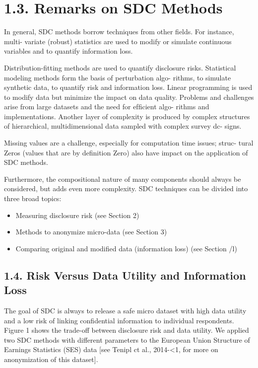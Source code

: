 \documentclass[]{article}
\begin{document}
\section*{1.3. Remarks on SDC Methods}
In general, SDC methods borrow techniques from other ﬁelds. For instance, multi-
variate (robust) statistics are used to modify or simulate continuous variables and
to quantify information loss. 

Distribution-ﬁtting methods are used to quantify
disclosure risks. Statistical modeling methods form the basis of perturbation algo-
rithms, to simulate synthetic data, to quantify risk and information loss. Linear
programming is used to modify data but minimize the impact on data quality.
Problems and challenges arise from large datasets and the need for efﬁcient algo-
rithms and implementations. Another layer of complexity is produced by complex
structures of hierarchical, multidimensional data sampled with complex survey dc-
signs. 

Missing values are a challenge, especially for computation time issues; struc-
tural Zeros (values that are by deﬁnition Zero) also have impact on the application
of SDC methods. 

Furthermore, the compositional nature of many components
should always be considered, but adds even more complexity.
SDC techniques can be divided into three broad topics:
\begin{itemize}
\item Measuring disclosure risk (see Section 2)
\item Methods to anonymize micro-data (see Section 3)
\item Comparing original and modiﬁed data (information loss) (see Section /l)
\end{itemize}

\subsection*{1.4. Risk Versus Data Utility and Information Loss}
The goal of SDC is always to release a safe micro dataset with high data utility and
a low risk of linking conﬁdential information to individual respondents. Figure 1
shows the trade-off between disclosure risk and data utility. We applied two SDC
methods with different parameters to the European Union Structure of Earnings
Statistics (SES) data [see Tenipl ct al., 2014-<1, for more on anonymization of this
dataset].
\end{document}
